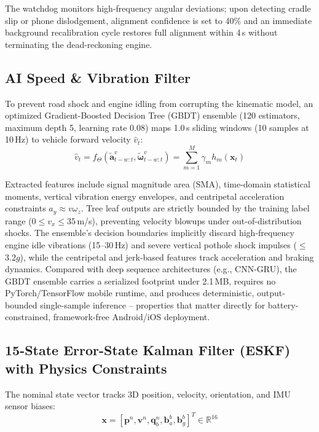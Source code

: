 The watchdog monitors high-frequency angular deviations; upon detecting cradle slip or phone dislodgement, alignment confidence is set to 40\% and an immediate background recalibration cycle restores full alignment within 4\,s without terminating the dead-reckoning engine.

\subsection{AI Speed \& Vibration Filter}

To prevent road shock and engine idling from corrupting the kinematic model, an optimized Gradient-Boosted Decision Tree (GBDT) ensemble (120 estimators, maximum depth 5, learning rate 0.08) maps 1.0\,s sliding windows (10 samples at 10\,Hz) to vehicle forward velocity $\hat{v}_t$:
\begin{equation}
\hat{v}_t = f_{\Theta}\left(\tilde{\mathbf{a}}^v_{t-w:t}, \tilde{\boldsymbol{\omega}}^v_{t-w:t}\right) = \sum_{m=1}^{M} \gamma_m h_m(\mathbf{x}_t)
\end{equation}

Extracted features include signal magnitude area (SMA), time-domain statistical moments, vertical vibration energy envelopes, and centripetal acceleration constraints $a_y \approx v\omega_z$. Tree leaf outputs are strictly bounded by the training label range ($0 \leq v_x \leq 35$\,m/s), preventing velocity blowups under out-of-distribution shocks. The ensemble's decision boundaries implicitly discard high-frequency engine idle vibrations (15--30\,Hz) and severe vertical pothole shock impulses ($\leq$3.2$g$), while the centripetal and jerk-based features track acceleration and braking dynamics. Compared with deep sequence architectures (e.g., CNN-GRU), the GBDT ensemble carries a serialized footprint under 2.1\,MB, requires no PyTorch/TensorFlow mobile runtime, and produces deterministic, output-bounded single-sample inference -- properties that matter directly for battery-constrained, framework-free Android/iOS deployment.

\subsection{15-State Error-State Kalman Filter (ESKF) with Physics Constraints}

The nominal state vector tracks 3D position, velocity, orientation, and IMU sensor biases:
\begin{equation}
\mathbf{x} = \left[\mathbf{p}^n, \mathbf{v}^n, \mathbf{q}_b^n, \mathbf{b}_a^b, \mathbf{b}_g^b\right]^T \in \mathbb{R}^{16}
\end{equation}

